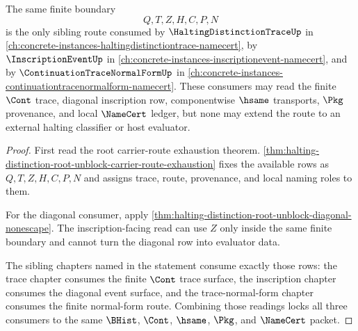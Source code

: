 \begin{theorem}
\label{thm:halting-distinction-root-unblock-sibling-consumer-lock}
The same finite boundary
$$
Q,T,Z,H,C,P,N
$$
is the only sibling route consumed by $\HaltingDistinctionTraceUp$ in \autoref{ch:concrete-instances-haltingdistinctiontrace-namecert}, by $\InscriptionEventUp$ in \autoref{ch:concrete-instances-inscriptionevent-namecert}, and by $\ContinuationTraceNormalFormUp$ in \autoref{ch:concrete-instances-continuationtracenormalform-namecert}. These consumers may read the finite $\Cont$ trace, diagonal inscription row, componentwise $\hsame$ transports, $\Pkg$ provenance, and local $\NameCert$ ledger, but none may extend the route to an external halting classifier or host evaluator.
\end{theorem}
\begin{proof}
First read the root carrier-route exhaustion theorem. \autoref{thm:halting-distinction-root-unblock-carrier-route-exhaustion} fixes the available rows as $Q,T,Z,H,C,P,N$ and assigns trace, route, provenance, and local naming roles to them.

For the diagonal consumer, apply \autoref{thm:halting-distinction-root-unblock-diagonal-nonescape}. The inscription-facing read can use $Z$ only inside the same finite boundary and cannot turn the diagonal row into evaluator data.

The sibling chapters named in the statement consume exactly those rows: the trace chapter consumes the finite $\Cont$ trace surface, the inscription chapter consumes the diagonal event surface, and the trace-normal-form chapter consumes the finite normal-form route. Combining those readings locks all three consumers to the same $\BHist$, $\Cont$, $\hsame$, $\Pkg$, and $\NameCert$ packet.
\end{proof}

